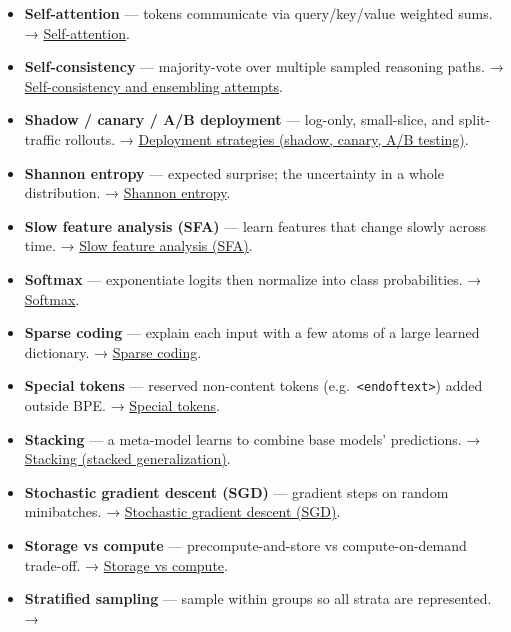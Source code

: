 \documentclass[
  10pt,
  letterpaper,
  onecolumn]{article}
\begin{document}
\begin{itemize}
  \protect\hyperlink{scaled-dot-product-attention}{Scaled dot-product
  attention}.
\item
  \textbf{Self-attention} --- tokens communicate via query/key/value
  weighted sums. → \protect\hyperlink{self-attention}{Self-attention}.
\item
  \textbf{Self-consistency} --- majority-vote over multiple sampled
  reasoning paths. →
  \protect\hyperlink{self-consistency-and-ensembling-attempts}{Self-consistency
  and ensembling attempts}.
\item
  \textbf{Shadow / canary / A/B deployment} --- log-only, small-slice,
  and split-traffic rollouts. →
  \protect\hyperlink{deployment-strategies-shadow-canary-ab-testing}{Deployment
  strategies (shadow, canary, A/B testing)}.
\item
  \textbf{Shannon entropy} --- expected surprise; the uncertainty in a
  whole distribution. →
  \protect\hyperlink{shannon-entropy}{Shannon entropy}.
\item
  \textbf{Slow feature analysis (SFA)} --- learn features that change
  slowly across time. →
  \protect\hyperlink{slow-feature-analysis-sfa}{Slow feature analysis
  (SFA)}.
\item
  \textbf{Softmax} --- exponentiate logits then normalize into class
  probabilities. → \protect\hyperlink{softmax}{Softmax}.
\item
  \textbf{Sparse coding} --- explain each input with a few atoms of a
  large learned dictionary. →
  \protect\hyperlink{sparse-coding}{Sparse coding}.
\item
  \textbf{Special tokens} --- reserved non-content tokens
  (e.g.~\texttt{\textless{}\textbar{}endoftext\textbar{}\textgreater{}})
  added outside BPE. → \protect\hyperlink{special-tokens}{Special
  tokens}.
\item
  \textbf{Stacking} --- a meta-model learns to combine base models'
  predictions. →
  \protect\hyperlink{stacking-stacked-generalization}{Stacking (stacked
  generalization)}.
\item
  \textbf{Stochastic gradient descent (SGD)} --- gradient steps on
  random minibatches. →
  \protect\hyperlink{stochastic-gradient-descent-sgd}{Stochastic
  gradient descent (SGD)}.
\item
  \textbf{Storage vs compute} --- precompute-and-store vs
  compute-on-demand trade-off. →
  \protect\hyperlink{storage-vs-compute}{Storage vs compute}.
\item
  \textbf{Stratified sampling} --- sample within groups so all strata
  are represented. →

\end{itemize}
\end{document}
